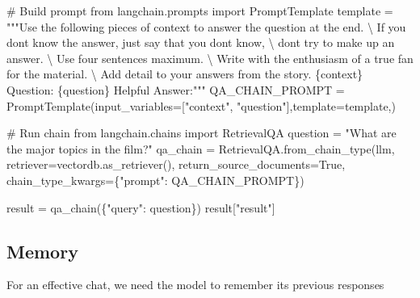 \documentclass[
  letterpaper,
  DIV=11,
  numbers=noendperiod]{scrreprt}
\newenvironment{Shaded}{\begin{snugshade}}{\end{snugshade}}
\newcommand{\CharTok}[1]{\textcolor[rgb]{0.13,0.47,0.30}{#1}}
\newcommand{\CommentTok}[1]{\textcolor[rgb]{0.37,0.37,0.37}{#1}}
\newcommand{\ImportTok}[1]{\textcolor[rgb]{0.00,0.46,0.62}{#1}}
\newcommand{\NormalTok}[1]{\textcolor[rgb]{0.00,0.23,0.31}{#1}}
\newcommand{\OperatorTok}[1]{\textcolor[rgb]{0.37,0.37,0.37}{#1}}
\newcommand{\SpecialCharTok}[1]{\textcolor[rgb]{0.37,0.37,0.37}{#1}}
\newcommand{\StringTok}[1]{\textcolor[rgb]{0.13,0.47,0.30}{#1}}
\newcommand{\VariableTok}[1]{\textcolor[rgb]{0.07,0.07,0.07}{#1}}
\begin{document}
\begin{Shaded}
\begin{Highlighting}[]
\CommentTok{\# Build prompt}
\ImportTok{from}\NormalTok{ langchain.prompts }\ImportTok{import}\NormalTok{ PromptTemplate}
\NormalTok{template }\OperatorTok{=} \StringTok{"""Use the following pieces of context to answer the question at the end. }\CharTok{\textbackslash{}}
\StringTok{If you don\textquotesingle{}t know the answer, just say that you don\textquotesingle{}t know, }\CharTok{\textbackslash{}}
\StringTok{don\textquotesingle{}t try to make up an answer.  }\CharTok{\textbackslash{}}
\StringTok{Use four sentences maximum.  }\CharTok{\textbackslash{}}
\StringTok{Write with the enthusiasm of a true fan for the material. }\CharTok{\textbackslash{}}
\StringTok{Add detail to your answers from the story.}
\SpecialCharTok{\{context\}}
\StringTok{Question: }\SpecialCharTok{\{question\}}
\StringTok{Helpful Answer:"""}
\NormalTok{QA\_CHAIN\_PROMPT }\OperatorTok{=}\NormalTok{ PromptTemplate(input\_variables}\OperatorTok{=}\NormalTok{[}\StringTok{"context"}\NormalTok{, }\StringTok{"question"}\NormalTok{],template}\OperatorTok{=}\NormalTok{template,)}

\CommentTok{\# Run chain}
\ImportTok{from}\NormalTok{ langchain.chains }\ImportTok{import}\NormalTok{ RetrievalQA}
\NormalTok{question }\OperatorTok{=} \StringTok{"What are the major topics in the film?"}
\NormalTok{qa\_chain }\OperatorTok{=}\NormalTok{ RetrievalQA.from\_chain\_type(llm,}
\NormalTok{                                       retriever}\OperatorTok{=}\NormalTok{vectordb.as\_retriever(),}
\NormalTok{                                       return\_source\_documents}\OperatorTok{=}\VariableTok{True}\NormalTok{,}
\NormalTok{                                       chain\_type\_kwargs}\OperatorTok{=}\NormalTok{\{}\StringTok{"prompt"}\NormalTok{: QA\_CHAIN\_PROMPT\})}


\NormalTok{result }\OperatorTok{=}\NormalTok{ qa\_chain(\{}\StringTok{"query"}\NormalTok{: question\})}
\NormalTok{result[}\StringTok{"result"}\NormalTok{]}
\end{Highlighting}
\end{Shaded}

\hypertarget{memory}{%
\subsection{Memory}\label{memory}}

For an effective chat, we need the model to remember its previous
responses
\end{document}
